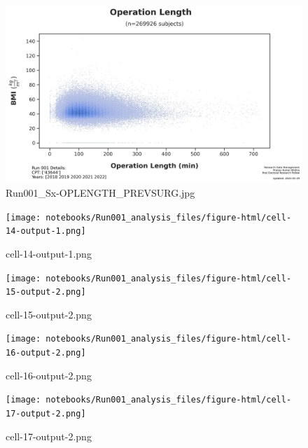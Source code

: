 \documentclass[
  letterpaper,
  DIV=11,
  numbers=noendperiod]{scrartcl}
\begin{document}
\begin{figure}[H]

{\centering \includegraphics{figures/surgery/Run001_Sx-OPLENGTH_PREVSURG.jpg}

}

\caption{Run001\_Sx-OPLENGTH\_PREVSURG.jpg}

\end{figure}%
\begin{figure}[H]

{\centering \texttt{[image: notebooks/Run001\_analysis\_files/figure-html/cell-14-output-1.png]}

}

\caption{cell-14-output-1.png}

\end{figure}%
\begin{figure}[H]

{\centering \texttt{[image: notebooks/Run001\_analysis\_files/figure-html/cell-15-output-2.png]}

}

\caption{cell-15-output-2.png}

\end{figure}%
\begin{figure}[H]

{\centering \texttt{[image: notebooks/Run001\_analysis\_files/figure-html/cell-16-output-2.png]}

}

\caption{cell-16-output-2.png}

\end{figure}%
\begin{figure}[H]

{\centering \texttt{[image: notebooks/Run001\_analysis\_files/figure-html/cell-17-output-2.png]}

}

\caption{cell-17-output-2.png}

\end{figure}%
\end{document}
